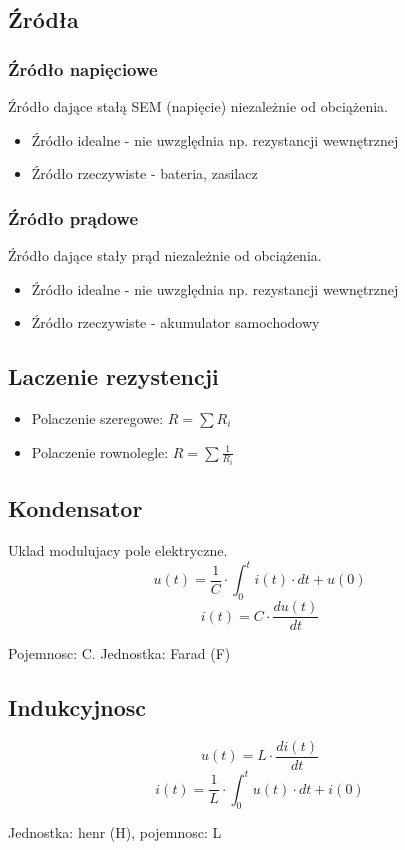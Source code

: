 \documentclass{article}
\begin{document}
\subsection{Źródła}
\subsubsection{Źródło napięciowe}
Źródło dające stałą SEM (napięcie) niezależnie od obciążenia.
\begin{itemize}
    \item Źródło idealne - nie uwzględnia np. rezystancji wewnętrznej
    \item Źródło rzeczywiste - bateria, zasilacz
\end{itemize}

\subsubsection{Źródło prądowe}
Źródło dające stały prąd niezależnie od obciążenia.
\begin{itemize}
    \item Źródło idealne - nie uwzględnia np. rezystancji wewnętrznej
    \item Źródło rzeczywiste - akumulator samochodowy
\end{itemize}

\subsection{Laczenie rezystencji}
\begin{itemize}
    \item Polaczenie szeregowe: $R=\sum R_i$
    \item Polaczenie rownolegle: $R=\sum \frac{1}{R_i}$
\end{itemize}

\subsection{Kondensator}
Uklad modulujacy pole elektryczne.
$$u(t) = \frac{1}{C}\cdot\int_0^{t}i(t)\cdot dt + u(0)$$
$$i(t)=C\cdot\frac{du(t)}{dt}$$

Pojemnosc: C. Jednostka: Farad (F)

\subsection{Indukcyjnosc}
$$u(t)=L\cdot\frac{di(t)}{dt}$$
$$i(t)=\frac{1}{L}\cdot\int_0^t u(t)\cdot dt + i(0)$$

Jednostka: henr (H), pojemnosc: L
\end{document}
